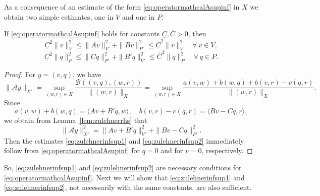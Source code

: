 As a consequence of an estimate of the form \eqref{eq:operatormathcalAsupinf} in $X$ we obtain two simple estimates, one in $V$ and one in $P$.
\begin{theorem}
If \eqref{eq:operatormathcalAsupinf} holds for constants $\underline{C}, \overline{C}>0$, then
\begin{equation}\label{eq:zulehnerinfsup1}
\underline{C}^2\|v\|_V^2\leq \|Av\|_{V'}^2 + \|Bv\|_{P'}^2 \leq \overline{C}^2\|v\|_V^2\quad \forall~v\in V,
\end{equation}
\begin{equation}\label{eq:zulehnerinfsup2}
\underline{C}^2\|q\|_P^2\leq \|Cq\|_{P'}^2 + \|B'q\|_{V'}^2 \leq \overline{C}^2\|q\|_P^2\quad \forall~q\in P.
\end{equation}
\end{theorem}
\begin{proof}
For $y=(v, q)$, we have
\[
\|\mathcal Ay\|_{X'}=\sup_{(w,r)\in X}\frac{\mathcal B((v,q), (w,r))}{\|(w,r)\|_{X}}
=\sup_{(w,r)\in X}\frac{a(v,w)+b(w,q)+b(v,r)-c(q,r)}{\|(w,r)\|_{X}}.
\]
Since
\[
a(v,w)+b(w,q)=\langle Av+B'q , w\rangle, \quad b(v,r)-c(q,r)=\langle Bv-Cq, r\rangle,
\]
we obtain from Lemma~\ref{lem:zulehnerrhs} that
\[
\|\mathcal Ay\|_{X'}^2 = \|Av+B'q\|_{V'}^2 + \|Bv-Cq\|_{P'}^2.
\]
Then the estimates \eqref{eq:zulehnerinfsup1} and \eqref{eq:zulehnerinfsup2} immediately follow from \eqref{eq:operatormathcalAsupinf} for $q=0$ and for $v=0$, respectively.
\end{proof}

So, \eqref{eq:zulehnerinfsup1} and \eqref{eq:zulehnerinfsup2} are necessary conditions for \eqref{eq:operatormathcalAsupinf}. Next we will show that \eqref{eq:zulehnerinfsup1} and \eqref{eq:zulehnerinfsup2}, not necessarily with the same constants, are also sufficient.

